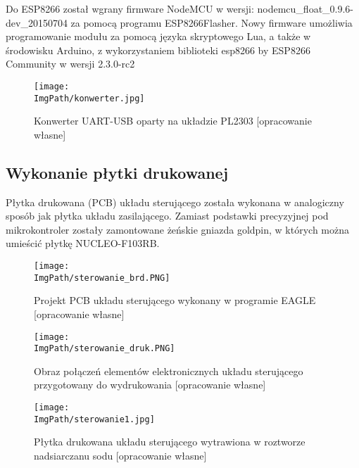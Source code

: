 \documentclass[a4paper,12pt,twoside,openany]{report}
\newcommand{\ImgPath}{.}
\begin{document}
\newpage
Do ESP8266 został wgrany firmware NodeMCU w wersji: nodemcu\_float\_0.9.6-dev\_20150704 za pomocą programu ESP8266Flasher. Nowy firmware umożliwia programowanie modułu za pomocą języka skryptowego Lua, a także w środowisku Arduino, z wykorzystaniem biblioteki esp8266 by ESP8266 Community w wersji 2.3.0-rc2

\begin{figure}[!htbp]
	\begin{center}
\centering
\texttt{[image: \\ImgPath/konwerter.jpg]}
\end{center}
	\caption{Konwerter UART-USB oparty na układzie PL2303 [opracowanie własne]}
	\label{schematKomunikacji}
\end{figure}

\subsection{Wykonanie płytki drukowanej}

Płytka drukowana (PCB) układu sterującego została wykonana w analogiczny sposób jak płytka układu zasilającego. Zamiast podstawki precyzyjnej pod mikrokontroler zostały zamontowane żeńskie gniazda goldpin, w których można umieścić płytkę NUCLEO-F103RB.

\begin{figure}[!htbp]
	\begin{center}
\centering
\texttt{[image: \\ImgPath/sterowanie\_brd.PNG]}
\end{center}
	\caption{Projekt PCB układu sterującego wykonany w programie EAGLE [opracowanie własne]}
	\label{schematKomunikacji}
\end{figure}

\begin{figure}[!htbp]
	\begin{center}
\centering
\texttt{[image: \\ImgPath/sterowanie\_druk.PNG]}
\end{center}
	\caption{Obraz połączeń elementów elektronicznych układu sterującego przygotowany do wydrukowania [opracowanie własne]}
	\label{schematKomunikacji}
\end{figure}

\begin{figure}[!htbp]
	\begin{center}
\centering
\texttt{[image: \\ImgPath/sterowanie1.jpg]}
\end{center}
	\caption{Płytka drukowana układu sterującego wytrawiona w roztworze nadsiarczanu sodu [opracowanie własne]}
	\label{schematKomunikacji}
\end{figure}
\end{document}
